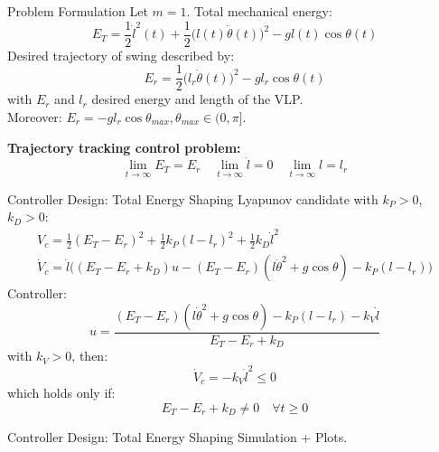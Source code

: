 \documentclass[10pt]{beamer}
\begin{document}
  \begin{frame}{Problem Formulation}
    Let $m=1$. Total mechanical energy:
		\begin{equation*}
      E_T = %
				\frac{1}{2}\dot{l}^2(t)+\frac{1}{2}\big(l(t)\dot{\theta}(t)\big)^2-
				gl(t)\cos\theta(t) 
    \end{equation*}
		Desired trajectory of swing described by:
		\begin{equation*}
      E_r = \frac{1}{2}\big(l_r\dot{\theta}(t)\big)^2-gl_r\cos\theta(t) 
    \end{equation*}
		with $E_r$ and $l_r$ desired energy and length of the VLP.\\Moreover:
		$E_r = -gl_r\cos\theta_{max}, \theta_{max} \in (0,\pi]$.

		\textbf{Trajectory tracking control problem:}
		\begin{equation*}
			\lim_{t\rightarrow \infty} E_T = E_r  \quad
			\lim_{t\rightarrow \infty} \dot{l} = 0 \quad
		  \lim_{t\rightarrow \infty} l = l_r
		\end{equation*}
  \end{frame}

  \begin{frame}{Controller Design: Total Energy Shaping}
    Lyapunov candidate with $k_P>0$, $k_D>0$:
		\begin{gather*}
			V_c = \frac{1}{2}(E_T-E_r)^2+\frac{1}{2}k_P(l-l_r)^2+
				\frac{1}{2}k_D\dot{l}^2 \\
			\dot{V}_c = \dot{l}\big((E_T-E_r+k_D)u-(E_T-E_r)(l\dot{\theta}^2+
				g\cos\theta)-k_P(l-l_r) \big)
		\end{gather*}
		Controller:
		\begin{equation*}
			u = \frac{(E_T-E_r)(l\dot{\theta}^2+g\cos\theta)-k_P(l-l_r)-
				k_V\dot{l}}{E_T-E_r+k_D}
		\end{equation*}
		with $k_V>0$, then:
		\begin{equation*}
			\dot{V}_c = -k_V\dot{l}^2 \leq 0
		\end{equation*}
		which holds only if:
		\begin{equation*}
			E_T-E_r+k_D  \neq 0 \quad \forall t\geq 0
		\end{equation*}
	\end{frame}

	\begin{frame}{Controller Design: Total Energy Shaping}
		Simulation + Plots.
	\end{frame}
\end{document}

